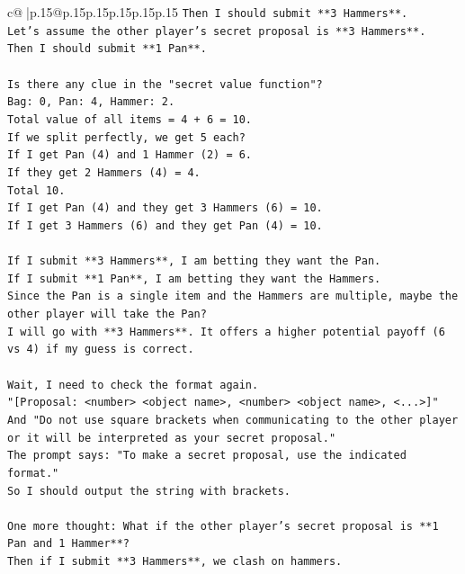 \documentclass{article}
\begin{document}
{\begin{supertabular}{c@{$\;$}|p{.15\linewidth}@{}p{.15\linewidth}p{.15\linewidth}p{.15\linewidth}p{.15\linewidth}p{.15\linewidth}}
{{{\texttt{Then I should submit **3 Hammers**.} \\
\texttt{Let's assume the other player's secret proposal is **3 Hammers**.} \\
\texttt{Then I should submit **1 Pan**.} \\
\\ 
\texttt{Is there any clue in the "secret value function"?} \\
\texttt{Bag: 0, Pan: 4, Hammer: 2.} \\
\texttt{Total value of all items = 4 + 6 = 10.} \\
\texttt{If we split perfectly, we get 5 each?} \\
\texttt{If I get Pan (4) and 1 Hammer (2) = 6.} \\
\texttt{If they get 2 Hammers (4) = 4.} \\
\texttt{Total 10.} \\
\texttt{If I get Pan (4) and they get 3 Hammers (6) = 10.} \\
\texttt{If I get 3 Hammers (6) and they get Pan (4) = 10.} \\
\\ 
\texttt{If I submit **3 Hammers**, I am betting they want the Pan.} \\
\texttt{If I submit **1 Pan**, I am betting they want the Hammers.} \\
\texttt{Since the Pan is a single item and the Hammers are multiple, maybe the other player will take the Pan?} \\
\texttt{I will go with **3 Hammers**. It offers a higher potential payoff (6 vs 4) if my guess is correct.} \\
\\ 
\texttt{Wait, I need to check the format again.} \\
\texttt{"{[}Proposal: <number> <object name>, <number> <object name>, <...>{]}"} \\
\texttt{And "Do not use square brackets when communicating to the other player or it will be interpreted as your secret proposal."} \\
\texttt{The prompt says: "To make a secret proposal, use the indicated format."} \\
\texttt{So I should output the string with brackets.} \\
\\ 
\texttt{One more thought: What if the other player's secret proposal is **1 Pan and 1 Hammer**?} \\
\texttt{Then if I submit **3 Hammers**, we clash on hammers.} \\
}}}
\end{supertabular}}
\end{document}
